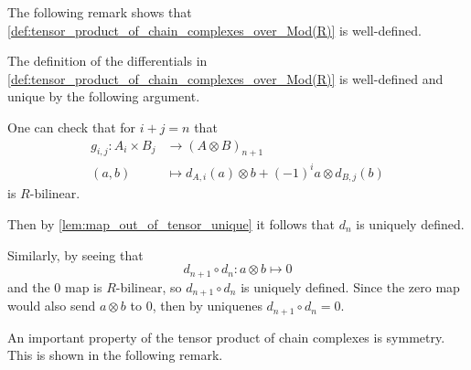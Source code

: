 The following remark shows that \autoref{def:tensor_product_of_chain_complexes_over_Mod(R)} is well-defined.

\begin{remark}
    The definition of the differentials in \autoref{def:tensor_product_of_chain_complexes_over_Mod(R)} is well-defined and unique by the following argument.

    One can check that for \( i + j = n \) that
    \begin{align*}
        g_{i, j}: A_i \times B_j &\to (A \otimes B)_{n + 1} \\
        (a, b) &\mapsto d_{A, i}(a) \otimes b + (-1)^i a \otimes d_{B, j}(b)
    \end{align*}
    is \( R \)-bilinear.

    Then by \autoref{lem:map_out_of_tensor_unique} it follows that \( d_n \) is uniquely defined.

    Similarly, by seeing that
    \[
        d_{n + 1} \circ d_n: a \otimes b \mapsto 0
    \]
    and the \( 0 \) map is \( R \)-bilinear, so \( d_{n + 1} \circ d_n \) is uniquely defined. Since the zero map would also send \( a \otimes b \) to \( 0 \), then by uniquenes \( d_{n + 1} \circ d_n = 0 \).
\end{remark}

An important property of the tensor product of chain complexes is symmetry. This is shown in the following remark.

